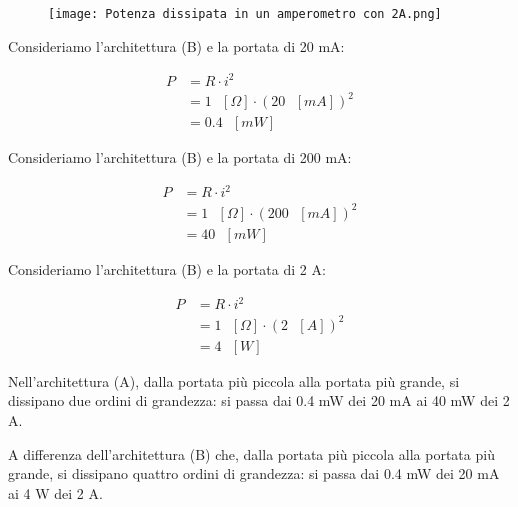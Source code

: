 \begin{figure}[h]
    \centering
    \texttt{[image: Potenza dissipata in un amperometro con 2A.png]}
\end{figure}

Consideriamo l'architettura (B) e la portata di 20 mA:

{
    \Large
    \begin{equation}
        \begin{split}
            P &= R \cdot i^{2}
            \\
            &= 1 \text{ }[\Omega] \cdot (20 \text{ } [mA])^{2}
            \\
            &= 
            0.4 \text{ }[mW] 
        \end{split}
    \end{equation}
}

Consideriamo l'architettura (B) e la portata di 200 mA:

{
    \Large
    \begin{equation}
        \begin{split}
            P &= R \cdot i^{2}
            \\
            &= 1 \text{ }[\Omega] \cdot (200 \text{ } [mA])^{2}
            \\
            &= 
            40 \text{ }[mW] 
        \end{split}
    \end{equation}
}

Consideriamo l'architettura (B) e la portata di 2 A:

{
    \Large
    \begin{equation}
        \begin{split}
            P &= R \cdot i^{2}
            \\
            &= 1 \text{ }[\Omega] \cdot (2 \text{ } [A])^{2}
            \\
            &= 
            4 \text{ }[W] 
        \end{split}
    \end{equation}
}

Nell'architettura (A), dalla portata più piccola alla portata più grande, si dissipano due ordini di grandezza: 
si passa dai 0.4 mW dei 20 mA ai 40 mW dei 2 A. \newline 

A differenza dell'architettura (B) che, dalla portata più piccola alla portata più grande, si dissipano  quattro ordini di grandezza: 
si passa dai 0.4 mW dei 20 mA ai 4 W dei 2 A. \newline 

